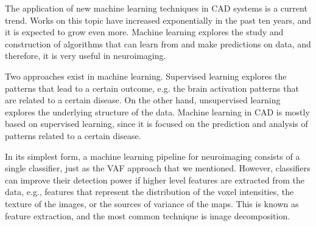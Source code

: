 The application of new machine learning techniques in CAD systems is a current trend. Works on this topic have increased exponentially in the past ten years, and it is expected to grow even more. Machine learning explores the study and construction of algorithms that can learn from and make predictions on data, and therefore, it is very useful in neuroimaging. 

Two approaches exist in machine learning. Supervised learning explores the patterns that lead to a certain outcome, e.g. the brain activation patterns that are related to a certain disease. On the other hand, unsupervised learning explores the underlying structure of the data. Machine learning in CAD is mostly based on supervised learning, since it is focused on the prediction and analysis of patterns related to a certain disease. 

In its simplest form, a machine learning pipeline for neuroimaging consists of a single classifier, just as the VAF approach that we mentioned. However, classifiers can improve their detection power if higher level features are extracted from the data, e.g., features that represent the distribution of the voxel intensities, the texture of the images, or the sources of variance of the maps. This is known as feature extraction, and the most common technique is image decomposition. 


